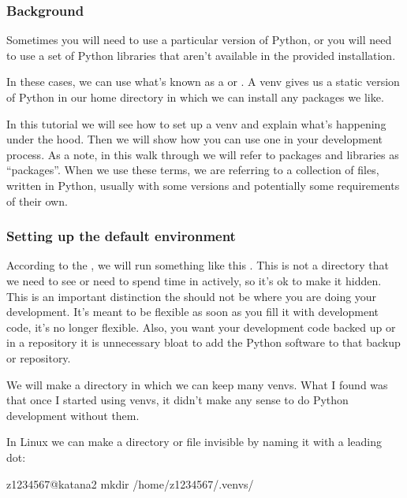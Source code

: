 \documentclass[letterpaper,10pt,english]{sphinxmanual}
\begin{document}
\subsubsection{Background}
\label{\detokenize{software/python-virtualenvs:background}}
Sometimes you will need to use a particular version of Python, or you will need to use a set of Python libraries that aren’t available in the provided installation.

In these cases, we can use what’s known as a  or . A venv gives us a static version of Python in our home directory in which we can install any packages we like.

In this tutorial we will see how to set up a venv and explain what’s happening under the hood. Then we will show how you can use one in your development process. As a note, in this walk through we will refer to packages and libraries as “packages”. When we use these terms, we are referring to a collection of files, written in Python, usually with some versions and potentially some requirements of their own.


\subsubsection{Setting up the default environment}
\label{\detokenize{software/python-virtualenvs:setting-up-the-default-environment}}
According to the , we will run something like this . This is not a directory that we need to see or need to spend time in actively, so it’s ok to make it hidden. This is an important distinction \sphinxhyphen{} the  should not be where you are doing your development. It’s meant to be flexible \sphinxhyphen{} as soon as you fill it with development code, it’s no longer flexible. Also, you want your development code backed up or in a repository \sphinxhyphen{} it is unnecessary bloat to add the Python software to that backup or repository.

We will make a directory in which we can keep many venvs. What I found was that once I started using venvs, it didn’t make any sense to do Python development without them.

In Linux we can make a directory or file invisible by naming it with a leading dot:

\begin{sphinxVerbatim}[commandchars=\\\{\}]
\PYG{o}{[}z1234567@katana2 \PYGZti{}\PYG{o}{]}\PYGZdl{} mkdir /home/z1234567/.venvs/
\end{sphinxVerbatim}
\end{document}

